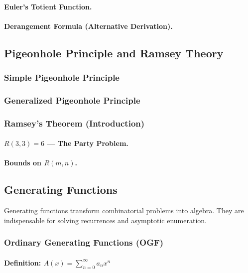 \paragraph{Euler's Totient Function.}
\paragraph{Derangement Formula (Alternative Derivation).}

\subsection{Pigeonhole Principle and Ramsey Theory}
\label{subsec:pigeonhole}

\subsubsection{Simple Pigeonhole Principle}
\subsubsection{Generalized Pigeonhole Principle}
\subsubsection{Ramsey's Theorem (Introduction)}
\paragraph{$R(3,3) = 6$ — The Party Problem.}
\paragraph{Bounds on $R(m,n)$.}

\subsection{Generating Functions}
\label{subsec:generating-functions}

\begin{subsectionintro}
Generating functions transform combinatorial problems into algebra. They are 
indispensable for solving recurrences and asymptotic enumeration.
\end{subsectionintro}

\subsubsection{Ordinary Generating Functions (OGF)}
\paragraph{Definition: $A(x) = \sum_{n=0}^{\infty} a_n x^n$}
